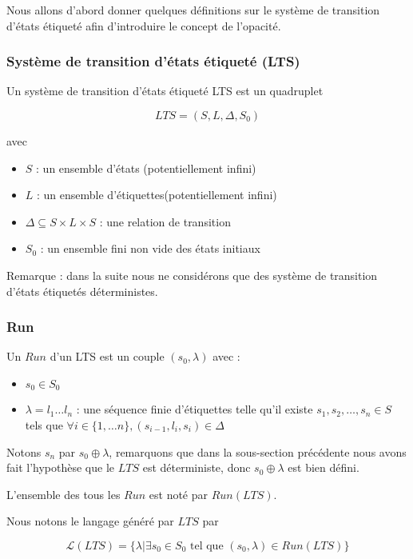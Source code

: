 \documentclass[10pt,a4paper]{article}
\begin{document}
Nous allons d'abord donner quelques d\'efinitions sur le syst\`eme de transition d'\'etats \'etiquet\'e afin d'introduire le concept de l'opacit\'e.

\subsubsection{Syst\`eme de transition d'\'etats \'etiquet\'e (LTS)}

Un syst\`eme de transition d'\'etats \'etiquet\'e LTS est un quadruplet 

$$LTS = (S,L,\Delta,S_0)$$

avec
\begin{itemize}
	\item $S$ : un ensemble d'\'etats (potentiellement infini)
	\item $L$ : un ensemble d'étiquettes(potentiellement infini)
	\item $\Delta \subseteq S\times L \times S$ : une relation de transition
	\item $S_0$ : un ensemble fini non vide des \'etats initiaux 
\end{itemize}

Remarque : dans la suite nous ne consid\'erons que des syst\`eme de transition d'\'etats \'etiquet\'es d\'eterministes.

\subsubsection{Run}	

Un $Run$ d'un LTS est un couple $(s_0,\lambda)$ avec :

\begin{itemize}
	\item $s_0 \in S_0$
	\item $\lambda = l_1 \dots l_n$ : une s\'equence finie d'\'etiquettes telle qu'il existe $s_1,s_2,\dots ,s_n \in S$ tels que $\forall i \in \{1, \dots n\}, (s_{i-1},l_i,s_i) \in \Delta$ 
\end{itemize}

Notons $s_n$ par $s_0\oplus \lambda$, remarquons que dans la sous-section pr\'ec\'edente nous avons fait l'hypoth\`ese que le $LTS$ est d\'eterministe, donc $s_0\oplus \lambda$ est bien d\'efini.

L'ensemble des tous les $Run$ est not\'e par $Run(LTS)$.

Nous notons le langage g\'en\'er\'e par $LTS$ par 

$$\mathcal{L}(LTS) = \{\lambda | \exists s_0 \in S_0 \mbox{ tel que } (s_0,\lambda) \in Run(LTS)\}$$
\end{document}
